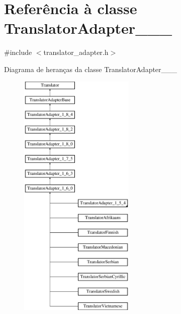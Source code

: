 \hypertarget{class_translator_adapter__1__6__0}{\section{Referência à classe Translator\-Adapter\-\_\-\_\-\_}
\label{class_translator_adapter__1__6__0}
}


{\ttfamily \#include $<$translator\-\_\-adapter.\-h$>$}

Diagrama de heranças da classe Translator\-Adapter\-\_\-\_\-\_\begin{figure}[H]
\begin{center}
\leavevmode
\includegraphics[height=12.000000cm]{class_translator_adapter__1__6__0}
\end{center}
\end{figure}

